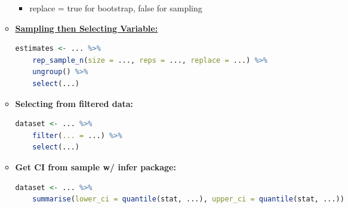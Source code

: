 \documentclass[8pt,landscape,a4paper, fleqn, dvipsnames]{extarticle}
\begin{document}
\begin{multicols*}{4}
\begin{itemize}
\begin{itemize}
        \begin{itemize}
            \item replace = true for bootstrap, false for sampling
        \end{itemize}
    \item \textbf{\underline{Sampling then Selecting Variable:}}
        \begin{lstlisting}[language = R]
estimates <- ... %>%
    rep_sample_n(size = ..., reps = ..., replace = ...) %>%
    ungroup() %>%
    select(...)
        \end{lstlisting}
        \item \textbf{Selecting from filtered data:}
        \begin{lstlisting}[language = R]
dataset <- ... %>%
    filter(... = ...) %>%
    select(...)
        \end{lstlisting}
        \item \textbf{Get CI from sample w/ infer package:}
        \begin{lstlisting}[language = R]
dataset <- ... %>%
    summarise(lower_ci = quantile(stat, ...), upper_ci = quantile(stat, ...))
        \end{lstlisting}
    \end{itemize}
\end{itemize}


\end{multicols*}
\end{document}
